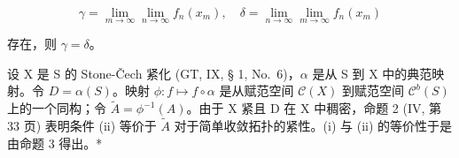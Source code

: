 \[
\gamma = \lim _ {m \rightarrow \infty} \lim _ {n \rightarrow \infty} f _ {n} (x _ {m}), \quad \delta = \lim _ {n \rightarrow \infty} \lim _ {m \rightarrow \infty} f _ {n} (x _ {m})
\]

存在，则 \(\gamma = \delta\)。

设 X 是 S 的 Stone-Čech 紧化 (GT, IX, § 1, No.~6)，\(\alpha\) 是从 S 到 X 中的典范映射。令 \(D = \alpha(S)\)。映射 \(\phi: f \mapsto f \circ \alpha\) 是从赋范空间 \(\mathcal{C}(X)\) 到赋范空间 \(\mathcal{C}^b(S)\) 上的一个同构；令 \(\tilde{A} = \phi^{-1}(A)\)。由于 X 紧且 D 在 X 中稠密，命题 2 (IV, 第 33 页) 表明条件 (ii) 等价于 \(\tilde{A}\) 对于简单收敛拓扑的紧性。(i) 与 (ii) 的等价性于是由命题 3 得出。*

